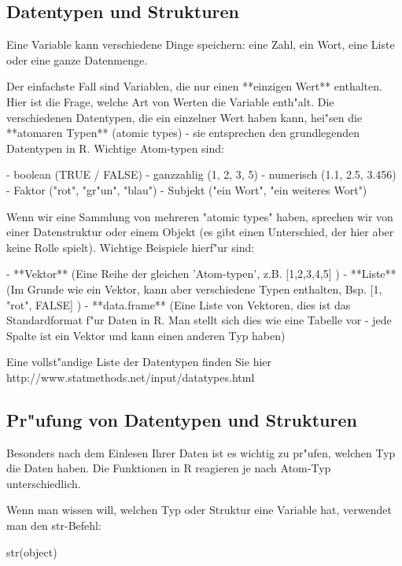 \documentclass[a4paper,twoside]{tufte-book}\usepackage[]{graphicx}\usepackage[]{color}
\begin{document}
\begin{appendices}
\section{Datentypen und Strukturen}

Eine Variable kann verschiedene Dinge speichern: eine Zahl, ein Wort, eine Liste oder eine ganze Datenmenge.

Der einfachste Fall sind Variablen, die nur einen **einzigen Wert** enthalten. Hier ist die Frage, welche Art von Werten die Variable enth"alt. Die verschiedenen Datentypen, die ein einzelner Wert haben kann, hei"sen die **atomaren Typen** (atomic types) - sie entsprechen den grundlegenden Datentypen in R. Wichtige Atom-typen sind:

- boolean (TRUE / FALSE)
- ganzzahlig (1, 2, 3, 5)
- numerisch (1.1, 2.5, 3.456)
- Faktor ("rot", "gr"un", "blau")
- Subjekt ("ein Wort", "ein weiteres Wort")

Wenn wir eine Sammlung von mehreren "atomic types" haben, sprechen wir von einer Datenstruktur oder einem Objekt (es gibt einen Unterschied, der hier aber keine Rolle spielt). Wichtige Beispiele hierf"ur sind:

- **Vektor** (Eine Reihe der gleichen 'Atom-typen', z.B. [1,2,3,4,5] )
- **Liste** (Im Grunde wie ein Vektor, kann aber verschiedene Typen enthalten, Bsp. [1, "rot", FALSE] )
- **data.frame** (Eine Liste von Vektoren, dies ist das Standardformat f"ur Daten in R. Man stellt sich dies wie eine Tabelle vor - jede Spalte ist ein Vektor und kann einen anderen Typ haben)

Eine vollst"andige Liste der Datentypen finden Sie hier http://www.statmethods.net/input/datatypes.html 
 
\subsection{Pr"ufung von Datentypen und Strukturen}

Besonders nach dem Einlesen Ihrer Daten ist es wichtig zu pr"ufen, welchen Typ die Daten haben. Die Funktionen in R reagieren je nach Atom-Typ unterschiedlich.

Wenn man wissen will, welchen Typ oder Struktur eine Variable hat, verwendet man den str-Befehl:

\begin{Schunk}
\begin{Sinput}
str(object)
\end{Sinput}
\end{Schunk}


\end{appendices}
\end{document}
